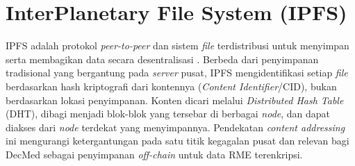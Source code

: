 \section{InterPlanetary File System (IPFS)}
\label{sec:ipfs}

IPFS adalah protokol \textit{peer-to-peer} dan sistem \textit{file} terdistribusi untuk menyimpan serta membagikan data secara desentralisasi \autocite{benet2014ipfs}. Berbeda dari penyimpanan tradisional yang bergantung pada \textit{server} pusat, IPFS mengidentifikasi setiap \textit{file} berdasarkan hash kriptografi dari kontennya (\textit{Content Identifier}/CID), bukan berdasarkan lokasi penyimpanan. Konten dicari melalui \textit{Distributed Hash Table} (DHT), dibagi menjadi blok-blok yang tersebar di berbagai \textit{node}, dan dapat diakses dari \textit{node} terdekat yang menyimpannya. Pendekatan \textit{content addressing} ini mengurangi ketergantungan pada satu titik kegagalan pusat dan relevan bagi DecMed sebagai penyimpanan \textit{off-chain} untuk data RME terenkripsi.